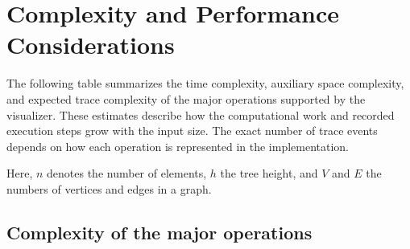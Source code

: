 \documentclass[11pt,a4paper]{article}
\begin{document}
\section{Complexity and Performance Considerations}


The following table summarizes the time complexity, auxiliary space complexity, and expected trace complexity of the major operations supported by the visualizer. These estimates describe how the computational work and recorded execution steps grow with the input size. The exact number of trace events depends on how each operation is represented in the implementation.

Here, $n$ denotes the number of elements, $h$ the tree height, and $V$ and $E$ the numbers of vertices and edges in a graph.


\subsection{Complexity of the major operations}
\end{document}
